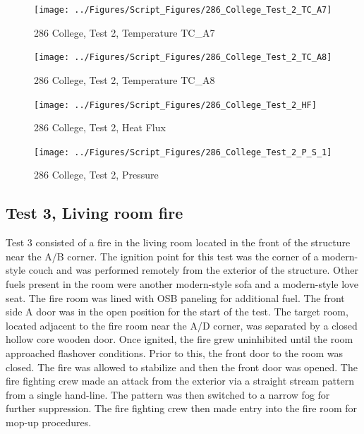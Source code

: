 \documentclass[12pt,oneside]{book}
\begin{document}
\begin{figure}[!ht]
\texttt{[image: ../Figures/Script\_Figures/286\_College\_Test\_2\_TC\_A7]}
\caption{286 College, Test 2, Temperature TC\_A7}
\label{fig:286_College_Test_2_TC_A7}
\end{figure}

\begin{figure}[!ht]
\texttt{[image: ../Figures/Script\_Figures/286\_College\_Test\_2\_TC\_A8]}
\caption{286 College, Test 2, Temperature TC\_A8}
\label{fig:286_College_Test_2_TC_A8}
\end{figure}

\begin{figure}[!ht]
\texttt{[image: ../Figures/Script\_Figures/286\_College\_Test\_2\_HF]}
\caption{286 College, Test 2, Heat Flux}
\label{fig:286_College_Test_2_HF}
\end{figure}

\begin{figure}[!ht]
\texttt{[image: ../Figures/Script\_Figures/286\_College\_Test\_2\_P\_S\_1]}
\caption{286 College, Test 2, Pressure}
\label{fig:286_College_Test_2_P_S_1}
\end{figure}


\clearpage


\subsection{Test 3, Living room fire}

Test 3 consisted of a fire in the living room located in the front of the structure near the A/B corner. The ignition point for this test was the corner of a modern-style couch and was performed remotely from the exterior of the structure. Other fuels present in the room were another modern-style sofa and a modern-style love seat. The fire room was lined with OSB paneling for additional fuel. The front side A door was in the open position for the start of the test. The target room, located adjacent to the fire room near the A/D corner, was separated by a closed hollow core wooden door. Once ignited, the fire grew uninhibited until the room approached flashover conditions. Prior to this, the front door to the room was closed. The fire was allowed to stabilize and then the front door was opened. The fire fighting crew made an attack from the exterior via a straight stream pattern from a single hand-line. The pattern was then switched to a narrow fog for further suppression. The fire fighting crew then made entry into the fire room for mop-up procedures.
\end{document}
